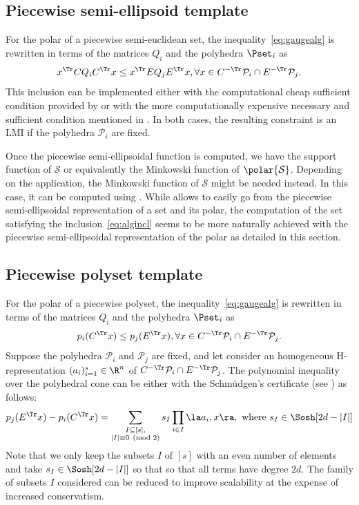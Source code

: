 \documentclass[11pt,twoside,a4paper,openright]{uclouvain-thesis}
\newcommand{\ineqnum}{s}
\begin{document}
\subsection{Piecewise semi-ellipsoid template}
For the polar of a piecewise semi-euclidean set,
the inequality~\eqref{eq:gaugealg} is rewritten in terms of the matrices
$Q_i$ and the polyhedra $\Pset_i$ as
\[
  x^\Tr C Q_i C^\Tr x \leq x^\Tr E Q_j E^\Tr x,
  \forall x \in C^{-\Tr} \mathcal{P}_i \cap E^{-\Tr} \mathcal{P}_j.
\]
This inclusion can be implemented either with the
computational cheap sufficient condition provided by 
or with the more computationally expensive necessary and sufficient condition mentioned in .
In both cases, the resulting constraint is an LMI if the polyhedra $\mathcal{P}_i$ are fixed.

Once the piecewise semi-ellipsoidal function is computed,
we have the support function of $\mathcal{S}$ or equivalently the Minkowski function of $\polar{\mathcal{S}}$.
Depending on the application, the Minkowski function of $\mathcal{S}$ might be needed instead.
In this case, it can be computed using .
While  allows to easily go from the piecewise semi-ellipsoidal representation
of a set and its polar, the computation of the set satisfying the inclusion~\eqref{eq:algincl} seems to be more naturally
achieved with the piecewise semi-ellipsoidal representation of the polar as detailed in this section.



\subsection{Piecewise polyset template}
For the polar of a piecewise polyset,
the inequality~\eqref{eq:gaugealg} is rewritten in terms of the matrices
$Q_i$ and the polyhedra $\Pset_i$ as
\[
  p_i(C^\Tr x) \leq p_j(E^\Tr x),
  \forall x \in C^{-\Tr} \mathcal{P}_i \cap E^{-\Tr} \mathcal{P}_j.
\]
Suppose the polyhedra $\mathcal{P}_i$ and $\mathcal{P}_j$ are fixed,
and let consider an homogeneous H-representation $(a_i)_{i=1}^{\ineqnum} \in \R^{n}$
of $C^{-\Tr} \mathcal{P}_i \cap E^{-\Tr} \mathcal{P}_j$.
The polynomial inequality over the polyhedral cone can be either with the Schm{\"u}dgen's certificate (see ) as follows:
\[
  p_j(E^\Tr x) - p_i(C^\Tr x) = \sum_{\substack{I \subseteq [\ineqnum],\\|I| \equiv 0 \pmod{2}}} s_I \prod_{i \in I} \la a_i, x \ra, \text{ where } s_I \in \Sosh[2d - |I|]
\]
Note that we only keep the subsets $I$ of $[\ineqnum]$ with an even number of elements
and take $s_I \in \Sosh[2d - |I|]$ so that so that all terms have degree $2d$.
The family of subsets $I$ considered can be reduced to improve scalability at the expense of increased conservatism.
\end{document}
